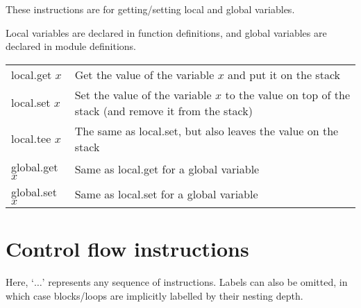 \documentclass[10pt,a4paper]{article}
\begin{document}
These instructions are for getting/setting local and global variables.

Local variables are declared in function definitions, and global variables are declared in module definitions.

\begin{xltabular}{\textwidth}{>{\sffamily}lX}
\toprule
local.get $x$ & Get the value of the variable $x$ and put it on the stack \\
local.set $x$ & Set the value of the variable $x$ to the value on top of the stack (and remove it from the stack) \\
local.tee $x$ & The same as \textsf{local.set}, but also leaves the value on the stack \\
global.get $x$ & Same as \textsf{local.get} for a global variable \\
global.set $x$ & Same as \textsf{local.set} for a global variable \\
\bottomrule
\end{xltabular}

\section*{Control flow instructions}

Here, `$\ldots$' represents any sequence of instructions. Labels can also be omitted, in which case blocks/loops are implicitly labelled by their nesting depth.

\end{document}
